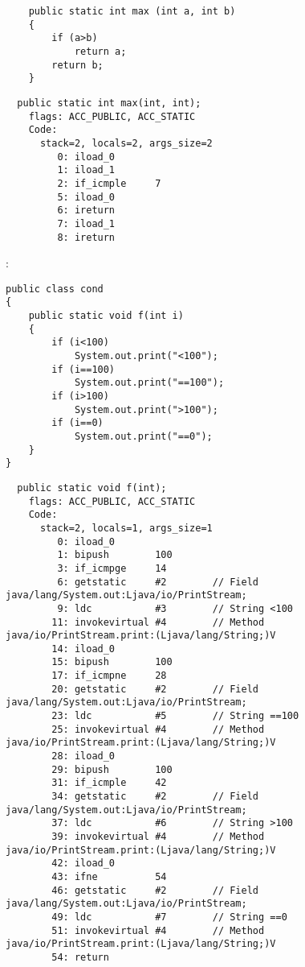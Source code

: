 
\begin{lstlisting}
	public static int max (int a, int b)
	{
		if (a>b)
			return a;
		return b;
	}
\end{lstlisting}


\begin{lstlisting}
  public static int max(int, int);
    flags: ACC_PUBLIC, ACC_STATIC
    Code:
      stack=2, locals=2, args_size=2
         0: iload_0       
         1: iload_1       
         2: if_icmple     7
         5: iload_0       
         6: ireturn       
         7: iload_1       
         8: ireturn       
\end{lstlisting}

:

\begin{lstlisting}
public class cond
{
	public static void f(int i)
	{
		if (i<100)
			System.out.print("<100");
		if (i==100)
			System.out.print("==100");
		if (i>100)
			System.out.print(">100");
		if (i==0)
			System.out.print("==0");
	}
}
\end{lstlisting}

\begin{lstlisting}
  public static void f(int);
    flags: ACC_PUBLIC, ACC_STATIC
    Code:
      stack=2, locals=1, args_size=1
         0: iload_0       
         1: bipush        100
         3: if_icmpge     14
         6: getstatic     #2        // Field java/lang/System.out:Ljava/io/PrintStream;
         9: ldc           #3        // String <100
        11: invokevirtual #4        // Method java/io/PrintStream.print:(Ljava/lang/String;)V
        14: iload_0       
        15: bipush        100
        17: if_icmpne     28
        20: getstatic     #2        // Field java/lang/System.out:Ljava/io/PrintStream;
        23: ldc           #5        // String ==100
        25: invokevirtual #4        // Method java/io/PrintStream.print:(Ljava/lang/String;)V
        28: iload_0       
        29: bipush        100
        31: if_icmple     42
        34: getstatic     #2        // Field java/lang/System.out:Ljava/io/PrintStream;
        37: ldc           #6        // String >100
        39: invokevirtual #4        // Method java/io/PrintStream.print:(Ljava/lang/String;)V
        42: iload_0       
        43: ifne          54
        46: getstatic     #2        // Field java/lang/System.out:Ljava/io/PrintStream;
        49: ldc           #7        // String ==0
        51: invokevirtual #4        // Method java/io/PrintStream.print:(Ljava/lang/String;)V
        54: return        
\end{lstlisting}

